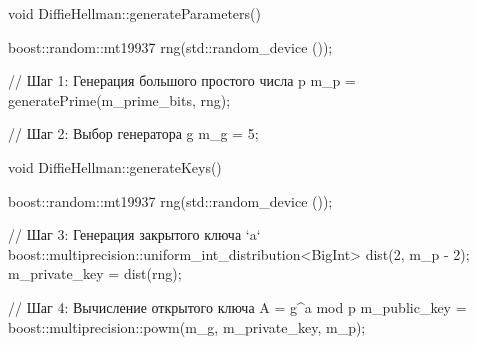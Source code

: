 \begin{nvimstyle}
void DiffieHellman::generateParameters()
{
	boost::random::mt19937 rng(std::random_device {}());

	// Шаг 1: Генерация большого простого числа p
	m_p = generatePrime(m_prime_bits, rng);

	// Шаг 2: Выбор генератора g
	m_g = 5;
}

void DiffieHellman::generateKeys()
{
	boost::random::mt19937 rng(std::random_device {}());

	// Шаг 3: Генерация закрытого ключа `a`
	boost::multiprecision::uniform_int_distribution<BigInt> dist(2, m_p - 2);
	m_private_key = dist(rng);

	// Шаг 4: Вычисление открытого ключа A = g^a mod p
	m_public_key = boost::multiprecision::powm(m_g, m_private_key, m_p);
}
\end{nvimstyle}